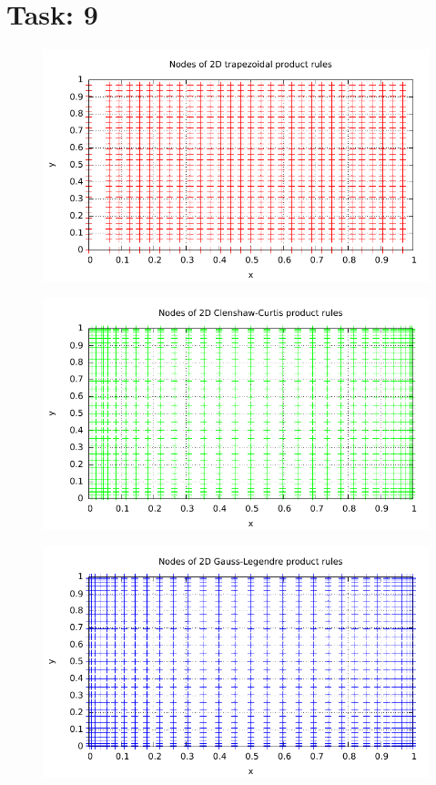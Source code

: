 \documentclass{article}
\begin{document}
\section*{Task: 9}

\begin{figure}[htbp]
  \centering
     \includegraphics[width=1.0\textwidth]{../Task09/sh3_task9_point_plot_trapezoidal.pdf}
\end{figure}

\begin{figure}[htbp]
  \centering
     \includegraphics[width=1.0\textwidth]{../Task09/sh3_task9_point_plot_clenshawCurtis.pdf}
\end{figure}

\begin{figure}[htbp]
  \centering
     \includegraphics[width=1.0\textwidth]{../Task09/sh3_task9_point_plot_gaussLegendre.pdf}
\end{figure}
\end{document}
